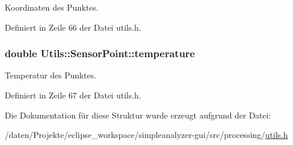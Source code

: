 Koordinaten des Punktes. 



Definiert in Zeile 66 der Datei utils.\-h.

\hypertarget{structUtils_1_1SensorPoint_a764d6572f865138b36cb46c910001e9a}{
\subsubsection[{temperature}]{\setlength{\rightskip}{0pt plus 5cm}double Utils\-::\-Sensor\-Point\-::temperature}}\label{structUtils_1_1SensorPoint_a764d6572f865138b36cb46c910001e9a}


Temperatur des Punktes. 



Definiert in Zeile 67 der Datei utils.\-h.



Die Dokumentation für diese Struktur wurde erzeugt aufgrund der Datei\-:\begin{DoxyCompactItemize}
\item 
/daten/\-Projekte/eclipse\-\_\-workspace/simpleanalyzer-\/gui/src/processing/\hyperlink{utils_8h}{utils.\-h}\end{DoxyCompactItemize}
